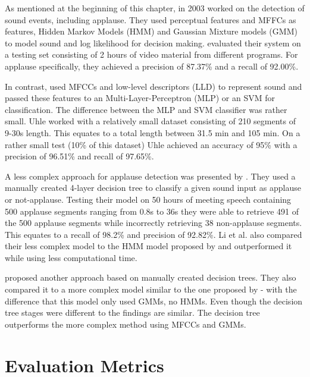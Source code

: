 \documentclass[bsc,frontabs,parskip,deptreport]{infthesis}
\begin{document}
As mentioned at the beginning of this chapter, in 2003 \citet{cai2003highlight} worked on the detection of sound events, including applause.
They used perceptual features and MFFCs as features, Hidden Markov Models (HMM) and Gaussian Mixture models (GMM) to model sound and log likelihood for decision making.
\citet{cai2003highlight} evaluated their system on a testing set consisting of 2 hours of video material from different programs.
For applause specifically, they achieved a precision of 87.37\% and a recall of 92.00\%.

In contrast, \citet{uhle2011applause} used MFCCs and low-level descriptors (LLD) to represent sound and passed these features to an Multi-Layer-Perceptron (MLP) or an SVM for classification.
The difference between the MLP and SVM classifier was rather small.
Uhle worked with a relatively small dataset consisting of 210 segments of 9-30s length. This equates to a total length between 31.5 min and 105 min.
On a rather small test (10\% of this dataset) Uhle achieved an accuracy of 95\% with a precision of 96.51\% and recall of 97.65\%.

A less complex approach for applause detection was presented by \citet{li2009characteristics}.
They used a manually created 4-layer decision tree to classify a given sound input as applause or not-applause.
Testing their model on 50 hours of meeting speech containing 500 applause segments ranging from 0.8s to 36s they were able to retrieve 491 of the 500 applause segments while incorrectly retrieving 38 non-applause segments.
This equates to a recall of 98.2\% and precision of 92.82\%. Li et al. also compared their less complex model to the HMM model proposed by \citet{cai2003highlight} and outperformed it while using less computational time.

\citet {manoj2011novel} proposed another approach based on manually created decision trees. They also compared it to a more complex model similar to the one proposed by \citet{cai2003highlight} - with the difference that this model only used GMMs, no HMMs.
Even though the decision tree stages were different to \citet{li2009characteristics} the findings are similar. The decision tree outperforms the more complex method using MFCCs and GMMs.  

\section{Evaluation Metrics} \label{theory}
\end{document}
